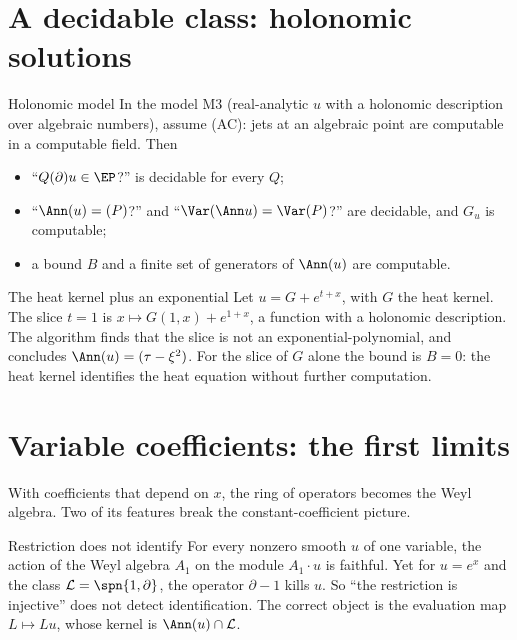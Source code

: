 \section{A decidable class: holonomic solutions}

\begin{theorem}{Holonomic model  }\label{thm:holo}
In the model M3 (real-analytic $u$ with a holonomic description over algebraic numbers), assume (AC): jets at an algebraic point are computable in a computable field. Then
\begin{itemize}
\item ``$Q(\partial)u\in\EP$?'' is decidable for every $Q$;
\item ``$\Ann(u)=(P)$?'' and ``$\Var(\Ann u)=\Var(P)$?'' are decidable, and $G_u$ is computable;
\item a bound $B$ and a finite set of generators of $\Ann(u)$ are computable.
\end{itemize}
\end{theorem}

\begin{example}{The heat kernel plus an exponential}
Let $u=G+e^{t+x}$, with $G$ the heat kernel. The slice $t=1$ is $x\mapsto G(1,x)+e^{1+x}$, a function with a holonomic description. The algorithm finds that the slice is not an exponential-polynomial, and concludes $\Ann(u)=(\tau-\xi^2)$. For the slice of $G$ alone the bound is $B=0$: the heat kernel identifies the heat equation without further computation.
\end{example}

\section{Variable coefficients: the first limits}

With coefficients that depend on $x$, the ring of operators becomes the Weyl algebra. Two of its features break the constant-coefficient picture.

\begin{proposition}{Restriction does not identify  \pw}\label{prop:weyl}
For every nonzero smooth $u$ of one variable, the action of the Weyl algebra $A_1$ on the module $A_1\cdot u$ is faithful. Yet for $u=e^x$ and the class $\mathcal L=\spn\{1,\partial\}$, the operator $\partial-1$ kills $u$. So ``the restriction is injective'' does not detect identification. The correct object is the evaluation map $L\mapsto Lu$, whose kernel is $\Ann(u)\cap\mathcal L$.

\end{proposition}

